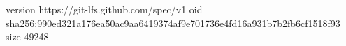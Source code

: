 version https://git-lfs.github.com/spec/v1
oid sha256:990ed321a176ea50ac9aa6419374af9e701736e4fd16a931b7b2fb6cf1518f93
size 49248
